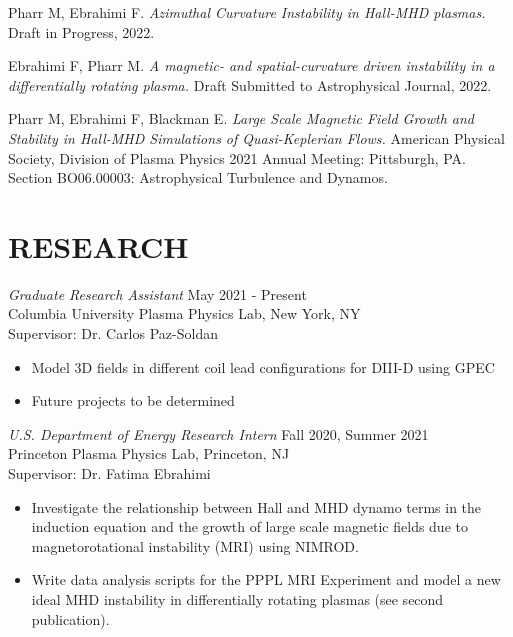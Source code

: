 \documentclass[margin]{rpires}
\begin{document}
\begin{resume}


Pharr M, Ebrahimi F. {\sl Azimuthal Curvature Instability in Hall-MHD plasmas.} Draft in Progress, 2022.
    
Ebrahimi F, Pharr M. {\sl A magnetic- and spatial-curvature driven instability in a differentially rotating plasma.} Draft Submitted to Astrophysical Journal, 2022.
    
Pharr M, Ebrahimi F, Blackman E. {\sl Large Scale Magnetic Field Growth and Stability in Hall-MHD Simulations of Quasi-Keplerian Flows.} American Physical Society, Division of Plasma Physics 2021 Annual Meeting: Pittsburgh, PA. Section BO06.00003: Astrophysical Turbulence and Dynamos.
    

\section{RESEARCH}
    {\sl Graduate Research Assistant} \hfill May 2021 - Present \\
    Columbia University Plasma Physics Lab, 
    New York, NY\\ 
    Supervisor: Dr. Carlos Paz-Soldan
    \begin{itemize}  \itemsep -2pt %
    \item Model 3D fields in different coil lead configurations for DIII-D using GPEC
    \item Future projects to be determined
    \end{itemize}

    {\sl U.S. Department of Energy Research Intern} \hfill Fall 2020, Summer 2021 \\
    Princeton Plasma Physics Lab, 
    Princeton, NJ\\ 
    Supervisor: Dr. Fatima Ebrahimi
    \begin{itemize}  \itemsep -2pt %
    \item Investigate the relationship between Hall and MHD dynamo terms in the induction equation and the growth of large scale magnetic fields due to magnetorotational instability (MRI) using NIMROD.
    \item Write data analysis scripts for the PPPL MRI Experiment and model a new ideal MHD instability in differentially rotating plasmas (see second publication).
    \end{itemize}


\end{resume}
\end{document}
